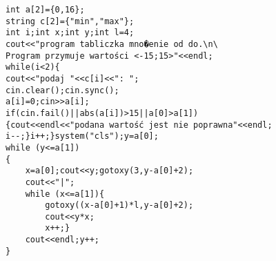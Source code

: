 \begin{verbatim}
int a[2]={0,16};
string c[2]={"min","max"};
int i;int x;int y;int l=4;
cout<<"program tabliczka mno�enie od do.\n\
Program przymuje wartości <-15;15>"<<endl;  
while(i<2){
cout<<"podaj "<<c[i]<<": ";
cin.clear();cin.sync();
a[i]=0;cin>>a[i];
if(cin.fail()||abs(a[i])>15||a[0]>a[1])
{cout<<endl<<"podana wartość jest nie poprawna"<<endl;
i--;}i++;}system("cls");y=a[0];
while (y<=a[1])
{
    x=a[0];cout<<y;gotoxy(3,y-a[0]+2);
    cout<<"|";
    while (x<=a[1]){
        gotoxy((x-a[0]+1)*l,y-a[0]+2);
        cout<<y*x;
        x++;}
    cout<<endl;y++;
}
\end{verbatim}